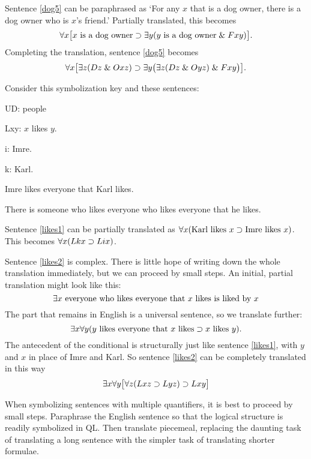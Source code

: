 Sentence \ref{dog5} can be paraphrased as `For any $x$ that is a dog owner, there is a dog owner who is $x$'s friend.' Partially translated, this becomes $$\forall x\bigl[\mbox{$x$ is a dog owner}\supset\exists y(\mbox{$y$ is a dog owner}\mathrel\& Fxy)\bigr].$$ Completing the translation, sentence \ref{dog5} becomes $$\forall x\bigl[\exists z(Dz \mathrel\& Oxz)\supset\exists y\bigl(\exists z(Dz \mathrel\& Oyz)\mathrel\& Fxy\bigr)\bigr].$$

Consider this symbolization key and these sentences:
\begin{ekey}
\item[UD:] people
\item[Lxy:] $x$ likes $y$.
\item[i:] Imre.
\item[k:] Karl.
\end{ekey}
\begin{earg}
\item[\ex{likes1}]Imre likes everyone that Karl likes.
\item[\ex{likes2}]There is someone who likes everyone who likes everyone that he likes.
\end{earg}

Sentence \ref{likes1} can be partially translated as $\forall x(\mbox{Karl likes $x$}\supset\mbox{Imre likes $x$})$. This becomes $\forall x(Lkx\supset Lix)$.


Sentence \ref{likes2} is complex. There is little hope of writing down the whole translation immediately, but we can proceed by small steps. An initial, partial translation might look like this: $$\exists x\ \mbox{everyone who likes everyone that $x$ likes is liked by $x$}$$
The part that remains in English is a universal sentence, so we translate further: $$\exists x\forall y(\mbox{$y$ likes everyone that $x$ likes}\supset\mbox{$x$ likes $y$}).$$
The antecedent of the conditional is structurally just like sentence \ref{likes1}, with $y$ and $x$ in place of Imre and Karl. So sentence \ref{likes2} can be completely translated in this way $$\exists x\forall y\bigl[\forall z(Lxz \supset Lyz) \supset Lxy\bigr]$$

When symbolizing sentences with multiple quantifiers, it is best to proceed by small steps. Paraphrase the English sentence so that the logical structure is readily symbolized in QL. Then translate piecemeal, replacing the daunting task of translating a long sentence with the simpler task of translating shorter formulae.






